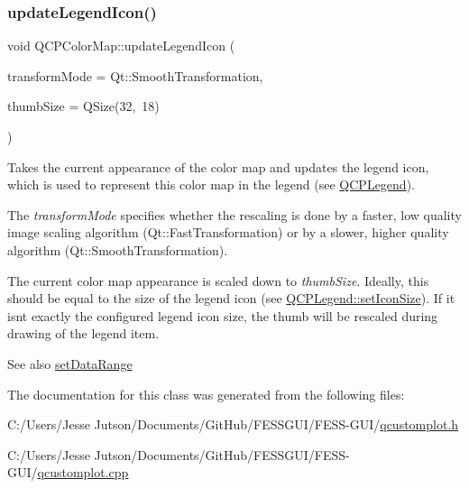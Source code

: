 \hypertarget{class_q_c_p_color_map_a5d8158b62d55fcfeaabcb68ce0083e87}{}\label{class_q_c_p_color_map_a5d8158b62d55fcfeaabcb68ce0083e87} 
\subsubsection{\texorpdfstring{update\+Legend\+Icon()}{updateLegendIcon()}}
{\footnotesize\ttfamily void Q\+C\+P\+Color\+Map\+::update\+Legend\+Icon (\begin{DoxyParamCaption}\item[{Qt\+::\+Transformation\+Mode}]{transform\+Mode = {\ttfamily Qt\+:\+:SmoothTransformation},  }\item[{const Q\+Size \&}]{thumb\+Size = {\ttfamily QSize(32,~18)} }\end{DoxyParamCaption})}

Takes the current appearance of the color map and updates the legend icon, which is used to represent this color map in the legend (see \hyperlink{class_q_c_p_legend}{Q\+C\+P\+Legend}).

The {\itshape transform\+Mode} specifies whether the rescaling is done by a faster, low quality image scaling algorithm (Qt\+::\+Fast\+Transformation) or by a slower, higher quality algorithm (Qt\+::\+Smooth\+Transformation).

The current color map appearance is scaled down to {\itshape thumb\+Size}. Ideally, this should be equal to the size of the legend icon (see \hyperlink{class_q_c_p_legend_a8b0740cce488bf7010da6beda6898984}{Q\+C\+P\+Legend\+::set\+Icon\+Size}). If it isn\textquotesingle{}t exactly the configured legend icon size, the thumb will be rescaled during drawing of the legend item.

\begin{DoxySeeAlso}{See also}
\hyperlink{class_q_c_p_color_map_a980b42837821159786a85b4b7dcb8774}{set\+Data\+Range} 
\end{DoxySeeAlso}


The documentation for this class was generated from the following files\+:\begin{DoxyCompactItemize}
\item 
C\+:/\+Users/\+Jesse Jutson/\+Documents/\+Git\+Hub/\+F\+E\+S\+S\+G\+U\+I/\+F\+E\+S\+S-\/\+G\+U\+I/\hyperlink{qcustomplot_8h}{qcustomplot.\+h}\item 
C\+:/\+Users/\+Jesse Jutson/\+Documents/\+Git\+Hub/\+F\+E\+S\+S\+G\+U\+I/\+F\+E\+S\+S-\/\+G\+U\+I/\hyperlink{qcustomplot_8cpp}{qcustomplot.\+cpp}\end{DoxyCompactItemize}
